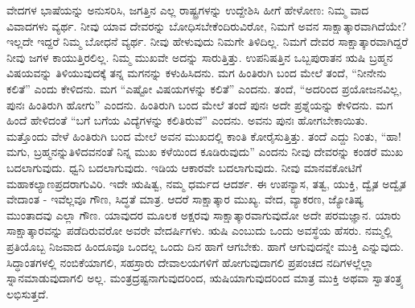 ವೇದಗಳ ಭಾಷೆಯನ್ನು ಅನುಸರಿಸಿ, ಜಗತ್ತಿನ ಎಲ್ಲ ರಾಷ್ಟ್ರಗಳನ್ನು ಉದ್ದೇಶಿಸಿ ಹೀಗೆ ಹೇಳೋಣ: ನಿಮ್ಮ ವಾದ ವಿವಾದಗಳು ವ್ಯರ್ಥ. ನೀವು ಯಾವ ದೇವರನ್ನು ಬೋಧಿಸಬೇಕೆಂದಿರುವಿರೋ, ನಿಮಗೆ ಅವನ ಸಾಕ್ಷಾತ್ಕಾರವಾಗಿದೆಯೇ? ಇಲ್ಲದೇ ಇದ್ದರೆ ನಿಮ್ಮ ಬೋಧನೆ ವ್ಯರ್ಥ. ನೀವು ಹೇಳುವುದು ನಿಮಗೇ ತಿಳಿದಿಲ್ಲ. ನಿಮಗೆ ದೇವರ ಸಾಕ್ಷಾತ್ಕಾರವಾಗಿದ್ದರೆ ನೀವು ಜಗಳ ಕಾಯುತ್ತಿರಲಿಲ್ಲ. ನಿಮ್ಮ ಮುಖವೇ ಅದನ್ನು ಸಾರುತ್ತಿತ್ತು. ಉಪನಿಷತ್ತಿನ ಒಬ್ಬ\break ಪುರಾತನ ಋಷಿ ಬ್ರಹ್ಮನ ವಿಷಯವನ್ನು ತಿಳಿಯುವುದಕ್ಕೆ ತನ್ನ ಮಗನನ್ನು ಕಳುಹಿಸಿದನು. ಮಗ ಹಿಂತಿರುಗಿ ಬಂದ ಮೇಲೆ ತಂದೆ, “ನೀನೇನು ಕಲಿತೆ” ಎಂದು ಕೇಳಿದನು. ಮಗ “ಎಷ್ಟೋ ವಿಷಯಗಳನ್ನು ಕಲಿತೆ” ಎಂದನು. ತಂದೆ, “ಅದರಿಂದ ಪ್ರಯೋಜನವಿಲ್ಲ, ಪುನಃ ಹಿಂತಿರುಗಿ ಹೋಗು” ಎಂದನು. ಹಿಂತಿರುಗಿ ಬಂದ ಮೇಲೆ ತಂದೆ ಪುನಃ ಅದೇ ಪ್ರಶ್ನೆಯನ್ನು ಕೇಳಿದನು. ಮಗ ಹಿಂದೆ ಹೇಳಿದಂತೆ “ಬಗೆ ಬಗೆಯ ವಿದ್ಯೆಗಳನ್ನು ಕಲಿತಿರುವೆ” ಎಂದನು. ಅವನು ಪುನಃ ಹೋಗಬೇಕಾಯಿತು. ಮತ್ತೊಂದು ವೇಳೆ ಹಿಂತಿರುಗಿ ಬಂದ ಮೇಲೆ ಅವನ ಮುಖದಲ್ಲಿ ಕಾಂತಿ ಕೋರೈಸುತ್ತಿತ್ತು. ತಂದೆ ಎದ್ದು ನಿಂತು, “ಹಾ! ಮಗು, ಬ್ರಹ್ಮನನ್ನು\break ತಿಳಿದವನಂತೆ ನಿನ್ನ ಮುಖ ಕಳೆಯಿಂದ ಕೂಡಿರುವುದು” ಎಂದನು ನೀವು ದೇವರನ್ನು ಕಂಡರೆ ಮುಖ ಬದಲಾಗುವುದು. ಧ್ವನಿ ಬದಲಾಗುವುದು. ಇಡಿಯ ಆಕಾರವೇ ಬದಲಾಗುವುದು. ನೀವು ಮಾನವಕೋಟಿಗೆ ಮಹಾಕಲ್ಯಾಣಪ್ರದರಾಗುವಿರಿ. ಇದೇ ಋಷಿತ್ವ, ನಮ್ಮ ಧರ್ಮದ ಆದರ್ಶ. ಈ ಉಪನ್ಯಾಸ, ತತ್ವ, ಯುಕ್ತಿ, ದ್ವೈತ ಅದ್ವೈತ ವೇದಾಂತ - ಇವೆಲ್ಲವೂ ಗೌಣ, ಸಿದ್ಧತೆ ಮಾತ್ರ. ಆದರೆ ಸಾಕ್ಷಾತ್ಕಾರ ಮುಖ್ಯ. ವೇದ, ವ್ಯಾಕರಣ, ಜ್ಯೋತಿಷ್ಯ ಮುಂತಾದವು ಎಲ್ಲಾ ಗೌಣ. ಯಾವುದರ ಮೂಲಕ ಅಕ್ಷರವು ಸಾಕ್ಷಾತ್ಕಾರವಾಗುವುದೋ ಅದೇ ಪರಮಜ್ಞಾನ. ಯಾರು ಸಾಕ್ಷಾತ್ಕಾರವನ್ನು ಪಡೆದಿರುವರೋ ಅವರೇ ವೇದರ್ಷಿಗಳು. ಋಷಿ ಎಂಬುದು ಒಂದು ಅವಸ್ಥೆಯ ಹೆಸರು. ನಮ್ಮಲ್ಲಿ ಪ್ರತಿಯೊಬ್ಬ ನಿಜವಾದ ಹಿಂದೂವೂ ಒಂದಲ್ಲ ಒಂದು ದಿನ ಹಾಗೆ ಆಗಬೇಕು. ಹಾಗೆ ಆಗುವುದನ್ನೇ ಮುಕ್ತಿ ಎನ್ನುವುದು. ಸಿದ್ಧಾಂತಗಳಲ್ಲಿ ನಂಬಿಕೆಯಾಗಲಿ, ಸಹಸ್ರಾರು ದೇವಾಲಯಗಳಿಗೆ ಹೋಗುವುದಾಗಲಿ ಪ್ರಪಂಚದ ನದಿಗಳಲ್ಲೆಲ್ಲಾ ಸ್ನಾನಮಾಡುವುದಾಗಲಿ ಅಲ್ಲ. ಮಂತ್ರದ್ರಷ್ಟನಾಗುವುದರಿಂದ, ಋಷಿಯಾಗುವುದರಿಂದ ಮಾತ್ರ ಮುಕ್ತಿ ಅಥವಾ ಸ್ವಾತಂತ್ರ್ಯ ಲಭಿಸುತ್ತದೆ.

\vskip 2pt

